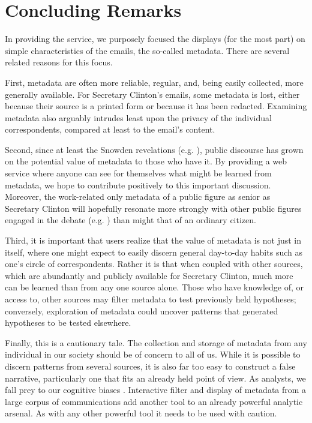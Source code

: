 \documentclass[journal]{vgtc}                %
\begin{document}
\section{Concluding Remarks}
In providing the service, we purposely focused the displays (for the most part) on simple characteristics of the emails, the so-called metadata.  There are several related reasons for this focus.  

First, metadata are often more reliable, regular, and, being easily collected, more generally available.  For Secretary Clinton's emails,  some metadata is lost, either because their source is a printed form or because it has been redacted.  Examining metadata also arguably intrudes least upon the privacy of the individual correspondents, compared at least to the email's content.  

Second, since at least the Snowden revelations (e.g. \cite{NYRsnowdenLeaks}), public discourse has grown on the potential value of metadata to those who have it.  By providing a web service where anyone can see for themselves what might be learned from metadata, we hope to contribute positively to this important discussion.  Moreover, the work-related only metadata of a public figure as senior as Secretary Clinton will hopefully resonate more strongly with other public figures  engaged in the debate (e.g.   \cite{NYRmetadata, ObamaMetadata, JebBushMetadata2015, PompeoMetadata, TrumpMetadata}) than might that of an ordinary citizen.  

Third, it is important that users realize that the value of metadata is not just in itself, where one might expect to easily discern general day-to-day habits such as one's circle of correspondents.  Rather it is that when coupled with other sources, which are abundantly and publicly available for Secretary Clinton, much more can be learned than from any one source alone.  Those who have knowledge of, or access to, other sources may filter metadata to test previously held hypotheses; conversely, exploration of metadata could uncover patterns that generated hypotheses to be tested elsewhere. 

Finally, this is a cautionary tale.  The collection and storage of metadata from any individual in our society should be of concern to all of us.  While it is possible to discern patterns from several sources, it is also far too easy to construct a false narrative, particularly one that fits an already held point of view.  As analysts, we fall prey to our cognitive biases \cite{gilgovichBook}.  Interactive filter and display of metadata from a large corpus of communications add another tool to an already powerful analytic arsenal.  As with any other powerful tool it needs to be used with caution.  


\newpage


%
%
%
%


\end{document}
